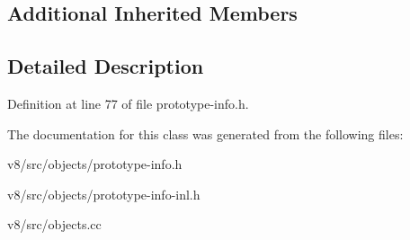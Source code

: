 \subsection*{Additional Inherited Members}


\subsection{Detailed Description}


Definition at line 77 of file prototype-\/info.\+h.



The documentation for this class was generated from the following files\+:\begin{DoxyCompactItemize}
\item 
v8/src/objects/prototype-\/info.\+h\item 
v8/src/objects/prototype-\/info-\/inl.\+h\item 
v8/src/objects.\+cc\end{DoxyCompactItemize}
